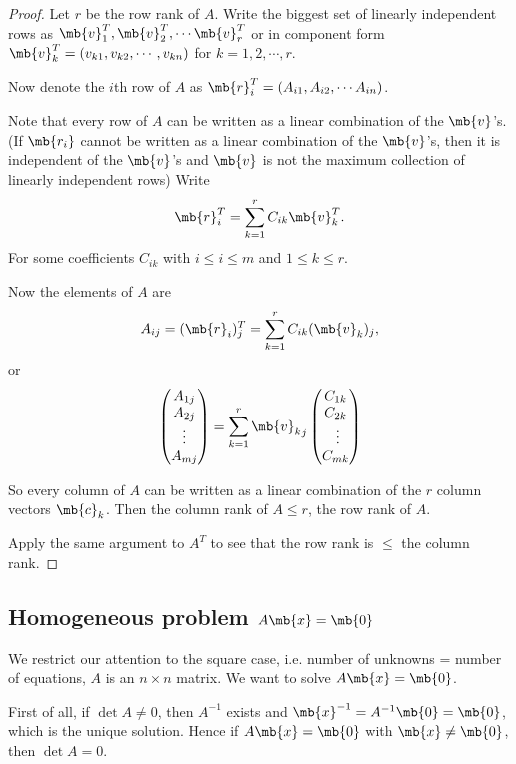 \documentclass[a4paper]{article}
\begin{document}
\begin{proof}
  Let $r$ be the row rank of $A$. Write the biggest set of linearly independent rows as $\mb{v}_1^T, \mb{v}_2^T, \cdots \mb{v}_r^T$ or in component form $\mb{v}_k^T = (v_{k1}, v_{k2}, \cdots, v_{kn})$ for $k = 1, 2, \cdots, r$.

Now denote the $i$th row of $A$ as $\mb{r}_i^T = (A_{i1}, A_{i2}, \cdots A_{in})$.

Note that every row of $A$ can be written as a linear combination of the $\mb{v}$'s. (If $\mb{r_i}$ cannot be written as a linear combination of the $\mb{v}$'s, then it is independent of the $\mb{v}$'s and $\mb{v}$ is not the maximum collection of linearly independent rows) Write
\[
\mb{r}_i^T = \sum_{k = 1}^r C_{ik}\mb{v}_{k}^T.
\]
For some coefficients $C_{ik}$ with $i \leq i\leq m$ and $1 \leq k \leq r$.

Now the elements of $A$ are
\[
A_{ij} = (\mb{r}_i)^T_j = \sum_{k = 1}^r C_{ik}(\mb{v}_k)_j,
\]
or
\[
\begin{pmatrix}
  A_{1j}\\
  A_{2j}\\
  \vdots\\
  A_{mj}
\end{pmatrix} = \sum_{k = 1}^r {\mb{v}_k}_j
\begin{pmatrix}
  C_{1k}\\
  C_{2k}\\\
  \vdots\\
  C_{mk}
\end{pmatrix}
\]

So every column of $A$ can be written as a linear combination of the $r$ column vectors $\mb{c}_k$. Then the column rank of $A \leq r$, the row rank of $A$.

Apply the same argument to $A^T$ to see that the row rank is $\leq$ the column rank.
\end{proof}

\subsection{Homogeneous problem \texorpdfstring{$A\mb{x} = \mb{0}$}{Ax = 0}}
We restrict our attention to the square case, i.e. number of unknowns = number of equations, $A$ is an $n\times n$ matrix. We want to solve $A\mb{x} = \mb{0}$.

First of all, if $\det A\not=0$, then $A^{-1}$ exists and $\mb{x}^{-1} = A^{-1}\mb{0} = \mb{0}$, which is the unique solution. Hence if $A\mb{x} = \mb{0}$ with $\mb{x} \not= \mb{0}$, then $\det A = 0$.
\end{document}
